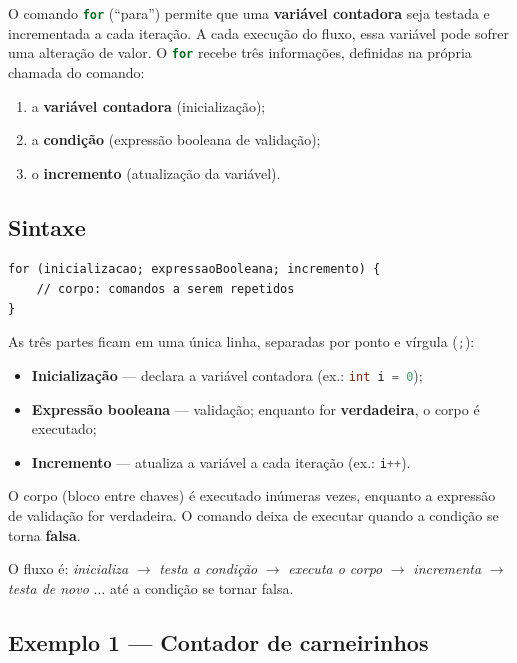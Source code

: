 \documentclass[12pt,a4paper]{article}
\newcommand{\codigo}[1]{\lstinline[language=Java,basicstyle=\ttfamily\small]|#1|}
\begin{document}
O comando \codigo{for} (``para'') permite que uma \textbf{variável contadora}
seja testada e incrementada a cada iteração. A cada execução do fluxo, essa
variável pode sofrer uma alteração de valor. O \codigo{for} recebe três
informações, definidas na própria chamada do comando:

\begin{enumerate}
  \item a \textbf{variável contadora} (inicialização);
  \item a \textbf{condição} (expressão booleana de validação);
  \item o \textbf{incremento} (atualização da variável).
\end{enumerate}

\subsection{Sintaxe}

\begin{lstlisting}[caption={Estrutura do \texttt{for}}]
for (inicializacao; expressaoBooleana; incremento) {
    // corpo: comandos a serem repetidos
}
\end{lstlisting}

As três partes ficam em uma única linha, separadas por ponto e vírgula
(\codigo{;}):
\begin{itemize}
  \item \textbf{Inicialização} --- declara a variável contadora (ex.: \codigo{int i = 0});
  \item \textbf{Expressão booleana} --- validação; enquanto for \textbf{verdadeira},
        o corpo é executado;
  \item \textbf{Incremento} --- atualiza a variável a cada iteração (ex.: \codigo{i++}).
\end{itemize}

O corpo (bloco entre chaves) é executado inúmeras vezes, enquanto a expressão de
validação for verdadeira. O comando deixa de executar quando a condição se torna
\textbf{falsa}.

O fluxo é: \emph{inicializa} $\rightarrow$ \emph{testa a condição} $\rightarrow$
\emph{executa o corpo} $\rightarrow$ \emph{incrementa} $\rightarrow$
\emph{testa de novo} $\ldots$ até a condição se tornar falsa.

\subsection{Exemplo 1 --- Contador de carneirinhos}
\end{document}
